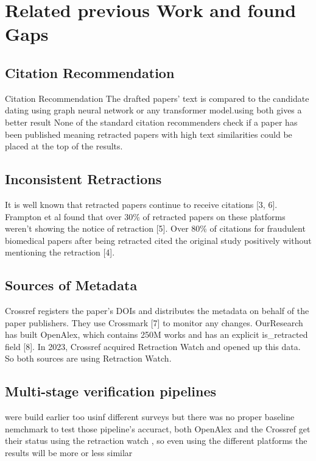 \documentclass[10pt,a4paper,twocolumn]{article}
\begin{document}
\section{Related previous Work and found Gaps}

\subsection{Citation Recommendation}

Citation Recommendation The drafted papers’ text is compared to the candidate dating using graph neural network or any transformer model.using both gives a better result None of the standard citation recommenders check if a paper has been published meaning retracted papers with high text similarities could be placed at the top of the results.


\subsection{Inconsistent Retractions}

It is well known that retracted papers continue to receive citations [3, 6]. Frampton et al found that over 30\% of retracted papers on these platforms weren’t showing the notice of retraction [5]. Over 80\% of citations for fraudulent biomedical papers after being retracted cited the original study positively without mentioning the retraction [4].


\subsection{Sources of Metadata}

Crossref registers the paper's DOIs and distributes the metadata on behalf of the paper publishers. They use Crossmark [7] to monitor any changes. OurResearch has built OpenAlex, which contains 250M works and has an explicit is\_retracted field [8]. In 2023, Crossref acquired Retraction Watch and opened up this data. So both sources are using Retraction Watch.


\subsection{Multi-stage verification pipelines}

were build earlier too usinf different surveys but there was no proper baseline nemchmark to test those pipeline's accuract, both OpenAlex and the Crossref get their status using the retraction watch , so even using the different platforms the results will be more or less similar
\end{document}
